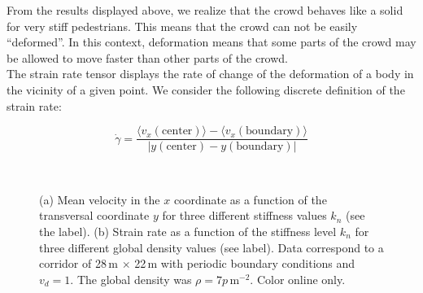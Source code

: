 \documentclass[preprint,12pt]{elsarticle}
\begin{document}
From the results displayed above, we realize that the crowd behaves like a solid
for very stiff pedestrians. This means that the crowd can not be easily
``deformed''. In this context, deformation means that some parts of the crowd
may be allowed to move faster than other parts of the crowd. \\

The strain rate tensor displays the rate of change of the deformation of a body
in the vicinity of a given point.  We consider the following discrete definition
of the strain rate:

\begin{equation}
\dot{\gamma} = \frac{\langle v_x(\mathrm{center})\rangle
 - \langle v_x(\mathrm{boundary})\rangle }{\left | y(\mathrm{center}) 
 - y(\mathrm{boundary}) \right |} 
\end{equation}


\begin{figure}[!htbp]
\centering
{}\ 
\\

\caption[width=0.47\columnwidth]{(a) Mean velocity in the $x$ coordinate as a 
function of the transversal coordinate $y$ for three different stiffness values 
$k_n$ (see the label). (b) Strain rate as a function of the stiffness level 
$k_n$ for three different global density values (see label). Data correspond to 
a corridor of 28$\,$m $\times$ 22$\,$m with periodic boundary conditions and 
$v_d=1$. The global density was $\rho=7 p\,$m$^{-2}$. Color online only. }
\label{profile_strain}
\end{figure}
\end{document}
